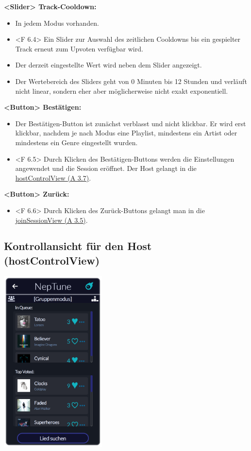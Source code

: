\documentclass[oneside, ngerman]{sdqtechreport}
\begin{document}
\textbf{<Slider> Track-Cooldown:}
\begin{itemize}
    \item In jedem Modus vorhanden.
    \item <F 6.4> Ein Slider zur Auswahl des zeitlichen Cooldowns bis ein gespielter Track erneut zum Upvoten verfügbar wird.
    \item Der derzeit eingestellte Wert wird neben dem Slider angezeigt.
    \item Der Wertebereich des Sliders geht von 0 Minuten bis 12 Stunden und verläuft nicht linear, sondern eher aber möglicherweise nicht exakt exponentiell.
\end{itemize}

\textbf{<Button> Bestätigen:}
\begin{itemize}
    \item Der Bestätigen-Button ist zunächst verblasst und nicht klickbar. Er wird erst klickbar, nachdem je nach Modus eine Playlist, mindestens ein Artist oder mindestens ein Genre eingestellt wurden.
    \item <F 6.5> Durch Klicken des Bestätigen-Buttons werden die Einstellungen angewendet und die Session eröffnet. Der Host gelangt in die \hyperlink{hostControlView}{hostControlView (A 3.7)}.
\end{itemize}

\textbf{<Button> Zurück:}
\begin{itemize}
    \item <F 6.6> Durch Klicken des Zurück-Buttons gelangt man in die  \hyperlink{joinSessionView}{joinSessionView (A 3.5)}.
\end{itemize}



\subsection{Kontrollansicht für den Host (hostControlView)}
\label{sec:Benutzeroberfläche:hostControlView}

\begin{center}
    \hypertarget{hostControlView}{}
    \includegraphics[width=0.4\textwidth]{LATEX/Pflichtenheft/GraphicDesigns/hostControlPage.png}
\end{center}
\end{document}

